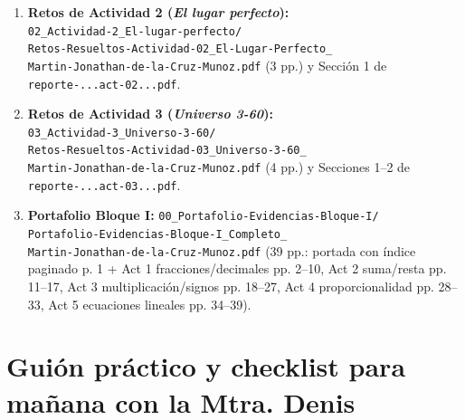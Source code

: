 \documentclass[spanish,letterpaper,oneside]{article}
\begin{document}
\begin{enumerate}[leftmargin=1.5em,itemsep=4pt]
  \item \textbf{Retos de Actividad 2 (\textit{El lugar perfecto}):}\\
  \hspace*{1.2em}\texttt{02\_Actividad-2\_El-lugar-perfecto/}\\
  \hspace*{1.2em}\texttt{Retos-Resueltos-Actividad-02\_El-Lugar-Perfecto\_}\\
  \hspace*{1.2em}\texttt{Martin-Jonathan-de-la-Cruz-Munoz.pdf} (3 pp.) y Sección 1 de \texttt{reporte-...act-02...pdf}.

  \item \textbf{Retos de Actividad 3 (\textit{Universo 3-60}):}\\
  \hspace*{1.2em}\texttt{03\_Actividad-3\_Universo-3-60/}\\
  \hspace*{1.2em}\texttt{Retos-Resueltos-Actividad-03\_Universo-3-60\_}\\
  \hspace*{1.2em}\texttt{Martin-Jonathan-de-la-Cruz-Munoz.pdf} (4 pp.) y Secciones 1--2 de \texttt{reporte-...act-03...pdf}.

  \item \textbf{Portafolio Bloque I:} \texttt{00\_Portafolio-Evidencias-Bloque-I/}\\
  \hspace*{1.2em}\texttt{Portafolio-Evidencias-Bloque-I\_Completo\_}\\
  \hspace*{1.2em}\texttt{Martin-Jonathan-de-la-Cruz-Munoz.pdf} (39 pp.: portada con índice paginado p. 1 + Act 1 fracciones/decimales pp. 2--10, Act 2 suma/resta pp. 11--17, Act 3 multiplicación/signos pp. 18--27, Act 4 proporcionalidad pp. 28--33, Act 5 ecuaciones lineales pp. 34--39).
\end{enumerate}

\section{Guión práctico y checklist para mañana con la Mtra. Denis}
\end{document}
